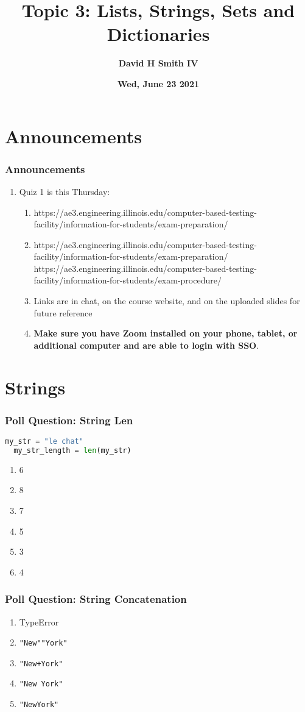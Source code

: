 \documentclass{beamer}
\title{\textbf{Topic 3: Lists, Strings, Sets and Dictionaries}}
\author{\textbf{David H Smith IV}}
\institute[\textbf{UIUC}]{\textbf{University of Illinois Urbana-Champaign}}
\date{\textbf{Wed, June 23 2021}}
\begin{document}
\frame{\titlepage}

\section{Announcements}

%
%
\begin{frame}
  \frametitle{Announcements}
  \begin{enumerate}
    \item Quiz 1 is this Thursday:
      \begin{enumerate}
        \item https://ae3.engineering.illinois.edu/computer-based-testing-facility/information-for-students/exam-preparation/
        \item https://ae3.engineering.illinois.edu/computer-based-testing-facility/information-for-students/exam-preparation/
          https://ae3.engineering.illinois.edu/computer-based-testing-facility/information-for-students/exam-procedure/ 
        \item Links are in chat, on the course website, and on the uploaded slides for future reference
        \item \textbf{Make sure you have Zoom installed on your phone, tablet, or additional computer and are able to login with SSO}.
      \end{enumerate}
  \end{enumerate}
\end{frame}

\section{Strings}
%
%
\begin{frame}[fragile]
  \frametitle{Poll Question: String Len}
  \begin{lstlisting}[language=Python] 
  my_str = "le chat"
  my_str_length = len(my_str)
  \end{lstlisting}
  \begin{enumerate}[A]
    \item 6
    \item 8
    \item 7 %
    \item 5
    \item 3
    \item 4
  \end{enumerate}
\end{frame}

%
%
\begin{frame}[fragile]
  \frametitle{Poll Question: String Concatenation}
  \begin{enumerate}[A] 
    \item TypeError
    \item \lstinline{"New""York"} 
    \item \lstinline{"New+York"} 
    \item \lstinline{"New York"} 
    \item \lstinline{"NewYork"} 
  \end{enumerate}
\end{frame}
\end{document}
